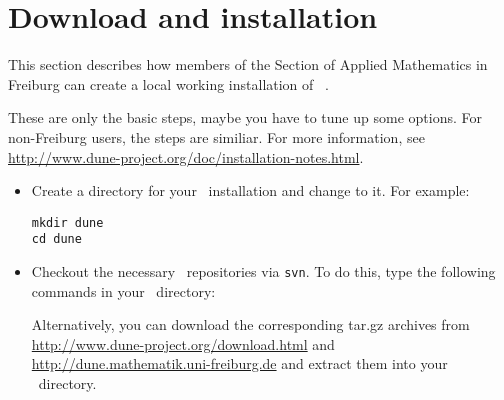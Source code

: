 
\section{Download and installation}
This section describes how members of the Section of Applied Mathematics in Freiburg can create a local working installation of \Dune\ .

These are only the basic steps, maybe you have to tune up some options. For non-Freiburg users, the steps are similiar.
For more information, see \url{http://www.dune-project.org/doc/installation-notes.html}.

\begin{itemize}
\item Create a directory for your \Dune\ installation and change to it. For example:
\begin{lstlisting}
mkdir dune
cd dune
\end{lstlisting}

%
%
%

\item Checkout the necessary \Dune\ repositories via \lstinline!svn!. To do this, type the following commands in your \Dune\ directory:
  \begin{lst} \label{checkout.sh} \mbox{}
    
  \end{lst}
Alternatively, you can download the corresponding tar.gz archives from \url{http://www.dune-project.org/download.html} and \url{http://dune.mathematik.uni-freiburg.de} and extract them into your \Dune\ directory.



\end{itemize}

